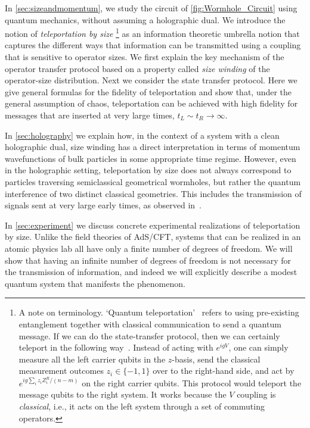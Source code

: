 \documentclass[aps,pra,reprint,floatfix,superscriptaddress, nofootinbib,longbibliography,onecolumn,notitlepage,12pt, tightenlines]{revtex4-1}
\begin{document}
In \cref{sec:sizeandmomentum}, we study the circuit of \cref{fig:Wormhole_Circuit} using quantum mechanics, without assuming a holographic dual.
We introduce the notion of \emph{teleportation by size}%
\footnote{A note on terminology. `Quantum teleportation'~\cite{QTeleportation} refers to using pre-existing entanglement together with classical communication to send a quantum message. If we can do the state-transfer protocol, then we can certainly teleport in the following way~\cite{maldacena2017diving}. Instead of acting with $e^{igV}$, one can simply measure all the left carrier qubits in the $z$-basis, send the classical measurement outcomes $z_i \in \{-1,1\}$ over to the right-hand side, and act by $e^{ig\sum_i z_i Z_i^R/(n-m)}$ on the right carrier qubits. This protocol would teleport the message qubits to the right system. It works because the $V$ coupling is \emph{classical}, i.e., it acts on the left system through a set of commuting operators.}
as an information theoretic umbrella notion that captures the different ways that information can be transmitted using a coupling that is sensitive to operator sizes.
We first explain the key mechanism of the operator transfer protocol based on a property called \emph{size winding} of the operator-size distribution.
Next we consider the state transfer protocol.
Here we give general formulas for the fidelity of teleportation and show that, under the general assumption of chaos, teleportation can be achieved with high fidelity for messages that are inserted at very large times, $t_L \sim t_R \rightarrow \infty$. 

In \cref{sec:holography} we explain how, in the context of a system with a clean holographic dual, size winding has a direct interpretation in terms of momentum wavefunctions of bulk particles in some appropriate time regime. 
However, even in the holographic setting, teleportation by size does not always correspond to particles traversing semiclassical geometrical wormholes, but rather the quantum interference of two distinct classical geometries.
This includes the transmission of signals sent at very large early times, as observed in~\cite{maldacena2017diving, gao2018regenesis}.

In \cref{sec:experiment} we discuss concrete experimental realizations of teleportation by size. Unlike the field theories of AdS/CFT, systems that can be realized in an atomic physics lab all have only a finite number of degrees of freedom. We will show that having an infinite number of degrees of freedom is not necessary for the transmission of information, and indeed we will explicitly describe a modest quantum system that manifests the phenomenon.
\end{document}

